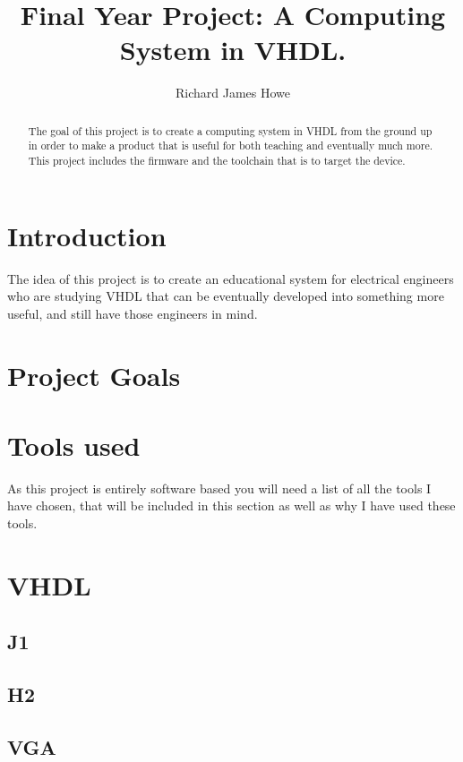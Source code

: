 \documentclass	[a4paper, 10pt]	{article}
\title		{Final Year Project: A Computing System in VHDL.}
\author		{Richard James Howe}
\begin{document}
	\maketitle
	\hrulefill

	\begin{abstract}
    The goal of this project is to create a computing system in VHDL from the
    ground up in order to make a product that is useful for both teaching and
    eventually much more. This project includes the firmware and the toolchain
    that is to target the device.
	\end{abstract}

	\tableofcontents
  \listoffigures

  \section{Introduction}

  The idea of this project is to create an educational system for electrical
  engineers who are studying VHDL that can be eventually developed into something 
  more useful, and still have those engineers in mind. 

  \section{Project Goals}

  \section{Tools used}
  
  As this project is entirely software based you will need a list of all the tools
  I have chosen, that will be included in this section as well as why I have used
  these tools.

  \section{VHDL}
    \subsection{J1}
    \subsection{H2}
    \subsection{VGA}
\end{document}
